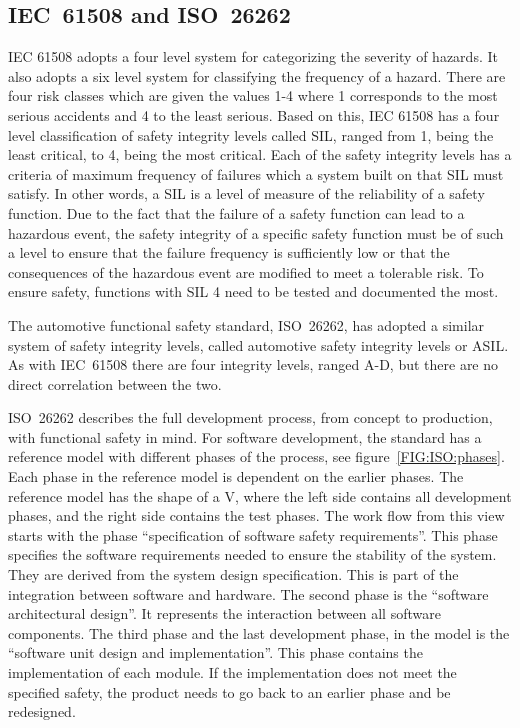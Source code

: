 \subsection {IEC~61508 and ISO~26262}
\label{SEC:ISO26262}
IEC 61508 adopts a four level system for categorizing the severity of
hazards. It also adopts a six level system for classifying the
frequency of a hazard. There are four risk classes which are given the
values 1-4 where 1 corresponds to the most serious accidents and 4 to
the least serious. Based on this, IEC 61508 has a four level
classification of safety integrity levels called SIL, ranged from 1,
being the least critical, to 4, being the most critical. Each of the
safety integrity levels has a criteria of maximum frequency of
failures which a system built on that SIL must satisfy. In other
words, a SIL is a level of measure of the reliability of a safety
function.  Due to the fact that the failure of a safety function can
lead to a hazardous event, the safety integrity of a specific safety
function must be of such a level to ensure that the failure frequency
is sufficiently low or that the consequences of the hazardous event
are modified to meet a tolerable risk. To ensure safety, functions
with SIL 4 need to be tested and documented the most.
\cite{COURSEBOOK:safety-critical}\cite{IEC61508}\cite{Advances:IEC61508}\cite{Advances:SIL4}

The automotive functional safety standard, ISO~26262, has adopted a
similar system of safety integrity levels, called automotive safety
integrity levels or ASIL. As with IEC~61508 there are four integrity
levels, ranged A-D, but there are no direct correlation between the
two. \cite{TI:safety_critical}

ISO~26262 describes the full development process, from concept to
production, with functional safety in mind. For software development,
the standard has a reference model with different phases of the
process, see figure~\ref{FIG:ISO:phases}. Each phase in the reference
model is dependent on the earlier phases. The reference model has the
shape of a V, where the left side contains all development phases, and
the right side contains the test phases. The work flow from this view
starts with the phase ``specification of software safety
requirements''. This phase specifies the software requirements needed
to ensure the stability of the system. They are derived from the
system design specification. This is part of the integration between
software and hardware. The second phase is the ``software
architectural design''. It represents the interaction between all
software components. The third phase and the last development phase,
in the model is the ``software unit design and implementation''. This
phase contains the implementation of each module. If the
implementation does not meet the specified safety, the product needs
to go back to an earlier phase and be redesigned. \cite[6:5.4]{ISO26262}\cite[p.8-9]{COURSEBOOK:safety-critical}


